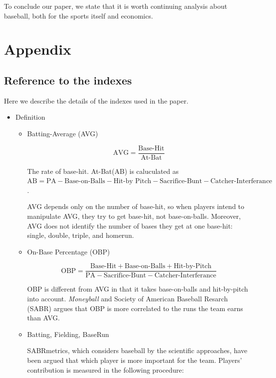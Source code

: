 \documentclass[dvipdfmx, 12pt]{article}
\begin{document}
To conclude our paper, we state that it is worth continuing analysis about baseball, both for the sports itself and economics.

\section{Appendix}

\subsection{Reference to the indexes}
\small

Here we describe the details of the indexes used in the paper.

\begin{itemize}
  \item Definition

  \begin{itemize}
    \item Batting-Average (AVG)

    \[
    \text{AVG} = \dfrac{\text{Base-Hit}}{\text{At-Bat}}
    \]

    The rate of base-hit. At-Bat(AB) is caluculated as $\text{AB} = \text{PA} - \text{Base-on-Balls} - \text{Hit-by Pitch} - \text{Sacrifice-Bunt} - \text{Catcher-Interferance}$.

    AVG depends only on the number of base-hit, so when players intend to manipulate AVG, they try to get base-hit, not base-on-balls. Moreover, AVG does not identify the number of bases they get at one base-hit: single, double, triple, and homerun.

    \item On-Base Percentage (OBP)

    \[
    \text{OBP} = \dfrac{\text{Base-Hit} + \text{Base-on-Balls} + \text{Hit-by-Pitch}}{\text{PA} - \text{Sacrifice-Bunt} - \text{Catcher-Interferance}}
    \]

    OBP is different from AVG in that it takes base-on-balls and hit-by-pitch into account. \textit{Moneyball} and Society of American Baseball Resarch (SABR) argues that OBP is more correlated to the runs the team earns than AVG.

    \item Batting, Fielding, BaseRun

    SABRmetrics, which considers baseball by the scientific approaches, have been argued that which player is more important for the team. Players' contribution is measured in the following procedure:


\end{itemize}
\end{itemize}
\end{document}
